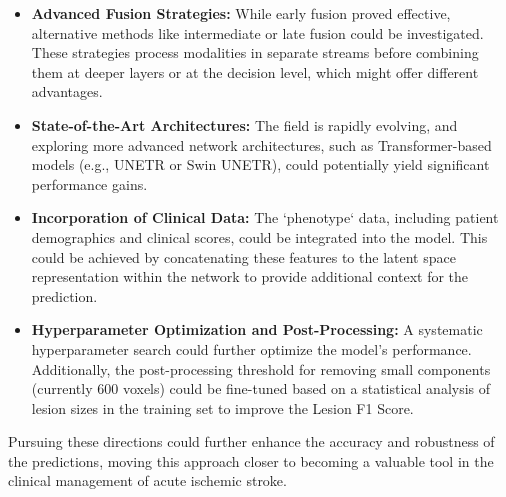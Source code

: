\begin{itemize}
    \item \textbf{Advanced Fusion Strategies:} While early fusion proved effective, alternative methods like intermediate or late fusion could be investigated. These strategies process modalities in separate streams before combining them at deeper layers or at the decision level, which might offer different advantages.

    \item \textbf{State-of-the-Art Architectures:} The field is rapidly evolving, and exploring more advanced network architectures, such as Transformer-based models (e.g., UNETR or Swin UNETR), could potentially yield significant performance gains.

    \item \textbf{Incorporation of Clinical Data:} The `phenotype` data, including patient demographics and clinical scores, could be integrated into the model. This could be achieved by concatenating these features to the latent space representation within the network to provide additional context for the prediction.

    \item \textbf{Hyperparameter Optimization and Post-Processing:} A systematic hyperparameter search could further optimize the model's performance. Additionally, the post-processing threshold for removing small components (currently 600 voxels) could be fine-tuned based on a statistical analysis of lesion sizes in the training set to improve the Lesion F1 Score.
\end{itemize}

Pursuing these directions could further enhance the accuracy and robustness of the predictions, moving this approach closer to becoming a valuable tool in the clinical management of acute ischemic stroke.